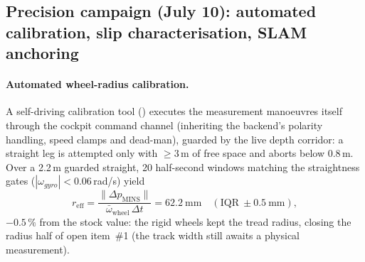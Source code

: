 \subsection{Precision campaign (July 10): automated calibration, slip
characterisation, SLAM anchoring}
\label{sec:precision-campaign}

\paragraph{Automated wheel-radius calibration.} A self-driving calibration
tool () executes the measurement manoeuvres
itself through the cockpit command channel (inheriting the backend's polarity
handling, speed clamps and dead-man), guarded by the live depth corridor: a
straight leg is attempted only with $\geq 3$\,m of free space and aborts
below 0.8\,m. Over a 2.2\,m guarded straight, 20 half-second windows
matching the straightness gates ($|\omega_{gyro}| < 0.06$\,rad/s) yield
\[
r_{\mathrm{eff}} = \frac{\lVert \Delta p_{\mathrm{MINS}} \rVert}
{\bar\omega_{\mathrm{wheel}}\,\Delta t}
= 62.2\ \mathrm{mm} \quad (\mathrm{IQR}\ \pm 0.5\ \mathrm{mm}),
\]
$-0.5\,\%$ from the stock value: the rigid wheels kept the tread radius,
closing the radius half of open item~\#1 (the track width still awaits a
physical measurement).

